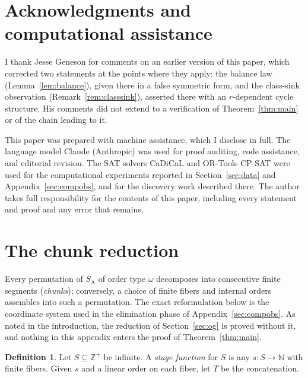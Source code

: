 \documentclass[11pt]{article}
\theoremstyle{definition}
\newtheorem{definition}[theorem]{Definition}
\newcommand{\Z}{\mathbb{Z}}
\newcommand{\N}{\mathbb{N}}
\newcommand{\SA}{S_{\mathrm{A}}}
\begin{document}
\section*{Acknowledgments and computational assistance}

I thank Jesse Geneson for comments on an earlier version of this paper,
which corrected two statements at the points where they apply: the balance
law (Lemma~\ref{lem:balance}), given there in a false symmetric form, and
the class-sink observation (Remark~\ref{rem:classsink}), asserted there
with an $r$-dependent cycle structure. His comments did not extend to a
verification of Theorem~\ref{thm:main} or of the chain leading to it.

This paper was prepared with machine assistance, which I disclose in full.
The language model Claude (Anthropic) was used for proof auditing, code
assistance, and editorial revision. The SAT solvers CaDiCaL and OR-Tools
CP-SAT were used for the computational experiments reported in
Section~\ref{sec:data} and Appendix~\ref{sec:compobs}, and for the
discovery work described there. The author takes full responsibility for
the contents of this paper, including every statement and proof and any
error that remains.

\appendix

\section{The chunk reduction}\label{sec:chunk}

\begin{sloppypar}
Every permutation of $\SA$ of order type $\omega$ decomposes into
consecutive finite segments (\emph{chunks}); conversely, a choice of finite
fibers and internal orders assembles into such a permutation. The exact
reformulation below is the coordinate system used in the elimination phase
of Appendix~\ref{sec:compobs}. As noted in the introduction, the reduction
of Section~\ref{sec:og} is proved without it, and nothing in this appendix
enters the proof of Theorem~\ref{thm:main}.
\end{sloppypar}

\begin{definition}
Let $S \subseteq \Z^+$ be infinite. A \emph{stage function} for $S$ is any
$s\colon S \to \N$ with finite fibers.
Given $s$ and a linear order on each fiber, let $T$ be the concatenation.
\end{definition}
\end{document}
